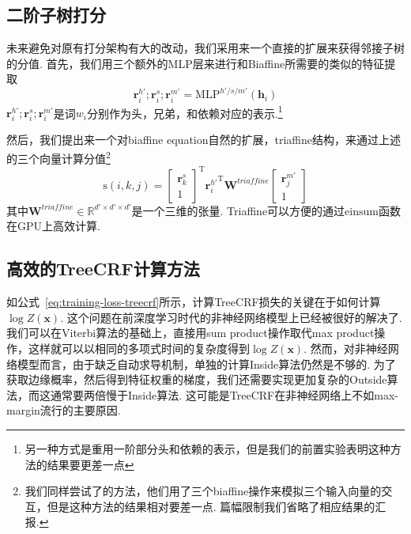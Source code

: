 \subsection{二阶子树打分}
未来避免对原有打分架构有大的改动，我们采用来一个直接的扩展来获得邻接子树的分值.
首先，我们用三个额外的MLP层来进行和Biaffine所需要的类似的特征提取
\begin{equation}
    \label{mlp-sib}
    \mathbf{r}_i^{h'}; \mathbf{r}_i^{s}; \mathbf{r}_i^{m'} =\mathrm{MLP}^{h'/s/m'} \left( \mathbf{h}_i \right)
\end{equation}
$\mathbf{r}_i^{h'}; \mathbf{r}_i^{s}; \mathbf{r}_i^{m'}$是词$w_i$分别作为头，兄弟，和依赖对应的表示.\footnote{
    另一种方式是重用一阶部分头和依赖的表示，但是我们的前置实验表明这种方法的结果要更差一点
}

然后，我们提出来一个对biaffine equation自然的扩展，triaffine结构，来通过上述的三个向量计算分值\footnote{
    我们同样尝试了\cite{wang-etal-2019-second}的方法，他们用了三个biaffine操作来模拟三个输入向量的交互，但是这种方法的结果相对要差一点.
    篇幅限制我们省略了相应结果的汇报.
}
\begin{equation} \label{eq:triaffine}
    \mathrm{s}(i,k,j) =
    \left[
        \begin{array}{c}
            \mathbf{r}_{k}^{s} \\
            1
        \end{array}
        \right]^\mathrm{T}
    {\mathbf{r}_{i}^{h'}}^\mathrm{T}
    \mathbf{W}^\textit{triaffine}
    \left[
        \begin{array}{c}
            \mathbf{r}_{j}^{m'} \\
            1
        \end{array}
        \right]
\end{equation}
其中$\mathbf{W}^\textit{triaffine} \in \mathbb{R}^{d' \times d' \times d'}$是一个三维的张量.
Triaffine可以方便的通过$\mathrm{einsum}$函数在GPU上高效计算.

\subsection{高效的TreeCRF计算方法}

如公式~\ref{eq:training-loss-treecrf}所示，计算TreeCRF损失的关键在于如何计算$\log Z(\boldsymbol{x})$.
这个问题在前深度学习时代的非神经网络模型上已经被很好的解决了.
我们可以在Viterbi算法的基础上，直接用sum product操作取代max product操作，这样就可以以相同的多项式时间的复杂度得到$\log Z(\boldsymbol{x})$.
然而，对非神经网络模型而言，由于缺乏自动求导机制，单独的计算Inside算法仍然是不够的.
为了获取边缘概率，然后得到特征权重的梯度，我们还需要实现更加复杂的Outside算法，而这通常要两倍慢于Inside算法.
这可能是TreeCRF在非神经网络上不如max-margin流行的主要原因.

